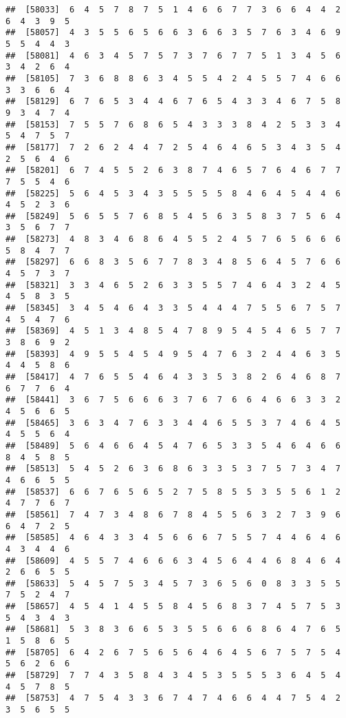 \documentclass[
]{book}
\begin{document}
\begin{verbatim}
##  [58033]  6  4  5  7  8  7  5  1  4  6  6  7  7  3  6  6  4  4  2  6  4  3  9  5
##  [58057]  4  3  5  5  6  5  6  6  3  6  6  3  5  7  6  3  4  6  9  5  5  4  4  3
##  [58081]  4  6  3  4  5  7  5  7  3  7  6  7  7  5  1  3  4  5  6  3  4  2  6  4
##  [58105]  7  3  6  8  8  6  3  4  5  5  4  2  4  5  5  7  4  6  6  3  3  6  6  4
##  [58129]  6  7  6  5  3  4  4  6  7  6  5  4  3  3  4  6  7  5  8  9  3  4  7  4
##  [58153]  7  5  5  7  6  8  6  5  4  3  3  3  8  4  2  5  3  3  4  5  4  7  5  7
##  [58177]  7  2  6  2  4  4  7  2  5  4  6  4  6  5  3  4  3  5  4  2  5  6  4  6
##  [58201]  6  7  4  5  5  2  6  3  8  7  4  6  5  7  6  4  6  7  7  7  5  5  4  6
##  [58225]  5  6  4  5  3  4  3  5  5  5  5  8  4  6  4  5  4  4  6  4  5  2  3  6
##  [58249]  5  6  5  5  7  6  8  5  4  5  6  3  5  8  3  7  5  6  4  3  5  6  7  7
##  [58273]  4  8  3  4  6  8  6  4  5  5  2  4  5  7  6  5  6  6  6  5  8  4  7  7
##  [58297]  6  6  8  3  5  6  7  7  8  3  4  8  5  6  4  5  7  6  6  4  5  7  3  7
##  [58321]  3  3  4  6  5  2  6  3  3  5  5  7  4  6  4  3  2  4  5  4  5  8  3  5
##  [58345]  3  4  5  4  6  4  3  3  5  4  4  4  7  5  5  6  7  5  7  4  5  4  7  6
##  [58369]  4  5  1  3  4  8  5  4  7  8  9  5  4  5  4  6  5  7  7  3  8  6  9  2
##  [58393]  4  9  5  5  4  5  4  9  5  4  7  6  3  2  4  4  6  3  5  4  4  5  8  6
##  [58417]  4  7  6  5  5  4  6  4  3  3  5  3  8  2  6  4  6  8  7  6  7  7  6  4
##  [58441]  3  6  7  5  6  6  6  3  7  6  7  6  6  4  6  6  3  3  2  4  5  6  6  5
##  [58465]  3  6  3  4  7  6  3  3  4  4  6  5  5  3  7  4  6  4  5  4  5  5  6  4
##  [58489]  5  6  4  6  6  4  5  4  7  6  5  3  3  5  4  6  4  6  6  8  4  5  8  5
##  [58513]  5  4  5  2  6  3  6  8  6  3  3  5  3  7  5  7  3  4  7  4  6  6  5  5
##  [58537]  6  6  7  6  5  6  5  2  7  5  8  5  5  3  5  5  6  1  2  4  7  7  6  7
##  [58561]  7  4  7  3  4  8  6  7  8  4  5  5  6  3  2  7  3  9  6  6  4  7  2  5
##  [58585]  4  6  4  3  3  4  5  6  6  6  7  5  5  7  4  4  6  4  6  4  3  4  4  6
##  [58609]  4  5  5  7  4  6  6  6  3  4  5  6  4  4  6  8  4  6  4  2  6  6  5  5
##  [58633]  5  4  5  7  5  3  4  5  7  3  6  5  6  0  8  3  3  5  5  7  5  2  4  7
##  [58657]  4  5  4  1  4  5  5  8  4  5  6  8  3  7  4  5  7  5  3  5  4  3  4  3
##  [58681]  5  3  8  3  6  6  5  3  5  5  6  6  6  8  6  4  7  6  5  1  5  8  6  5
##  [58705]  6  4  2  6  7  5  6  5  6  4  6  4  5  6  7  5  7  5  4  5  6  2  6  6
##  [58729]  7  7  4  3  5  8  4  3  4  5  3  5  5  5  3  6  4  5  4  4  5  7  8  5
##  [58753]  4  7  5  4  3  3  6  7  4  7  4  6  6  4  4  7  5  4  2  3  5  6  5  5

\end{verbatim}
\end{document}
